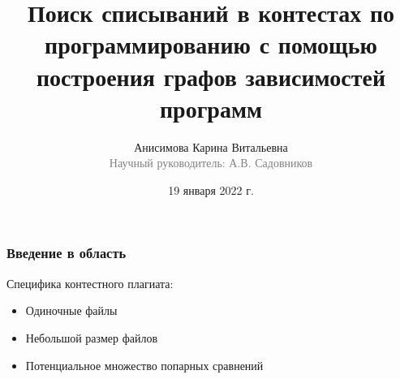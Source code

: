 \documentclass[10pt]{beamer}
\begin{document}
\title[Поиск списываний в контестах]{Поиск списываний в контестах по программированию с помощью построения графов зависимостей программ}

\author[Анисимова К.В.]{Анисимова Карина Витальевна\\{\footnotesize\textcolor{gray}{Научный руководитель: А.В. Садовников}}}
\date{19 января 2022 г.}
\frame{\titlepage}

\begin{frame}[fragile]\frametitle{Введение в область}
	Специфика контестного плагиата:
	\begin{itemize}
		\item Одиночные файлы
		\item Небольшой размер файлов
		\item Потенциальное множество попарных сравнений
	\end{itemize}
\end{frame}
\end{document}

